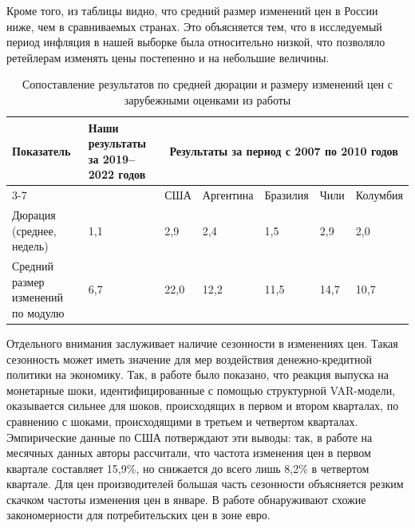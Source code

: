 Кроме того, из таблицы видно, что средний размер изменений цен в России ниже, чем в сравниваемых странах. Это объясняется тем, что в исследуемый период инфляция в нашей выборке была относительно низкой, что позволяло ретейлерам изменять цены постепенно и на небольшие величины.

\begin{table}[h]
	\centering
	\small %
	\caption{Сопоставление результатов по средней дюрации и размеру изменений цен с зарубежными оценками из работы \cite{cavallo2018scraped}}
	\label{tab:comparison}
	\begin{tabularx}{\textwidth}{|X|X|X|X|X|X|X|} %
		\hline
		Показатель & Наши результаты за 2019–2022 годов & \multicolumn{5}{c|}{Результаты \cite{cavallo2018scraped} за период с 2007 по 2010 годов} \\
		\cline{3-7}
		&  & США & Аргентина & Бразилия & Чили & Колумбия \\
		\hline
		Дюрация (среднее, недель) & 1,1 & 2,9 & 2,4 & 1,5 & 2,9 & 2,0 \\
		\hline
		Средний размер изменений по модулю & 6,7 & 22,0 & 12,2 & 11,5 & 14,7 & 10,7 \\
		\hline
	\end{tabularx}
	\vspace{1ex} %
	\raggedright
\end{table}

% 

Отдельного внимания заслуживает наличие сезонности в изменениях цен. Такая сезонность может иметь значение для мер воздействия денежно-кредитной политики на экономику. Так, в работе \cite{olivei2007} было показано, что реакция выпуска на монетарные шоки, идентифицированные с помощью структурной VAR-модели, оказывается сильнее для шоков, происходящих в первом и втором кварталах, по сравнению с шоками, происходящими в третьем и четвертом кварталах. Эмпирические данные по США потверждают эти выводы: так, в работе \cite{Nakamura2008} на месячных данных авторы рассчитали, что частота изменения цен в первом квартале составляет 15,9\%, но снижается до всего лишь 8,2\% в четвертом квартале. Для цен производителей большая часть сезонности объясняется резким скачком частоты изменения цен в январе. В работе \cite{alvarez2006sticky} обнаруживают схожие закономерности для потребительских цен в зоне евро.

